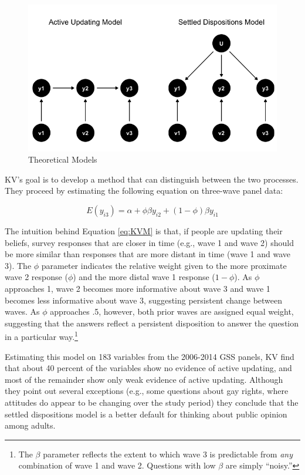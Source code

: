 \documentclass[
  11pt,
]{article}
\begin{document}
\begin{figure}

{\centering \includegraphics[width=0.8\linewidth]{KVimage} 

}

\caption{Theoretical Models}\label{fig:mods}
\end{figure}

KV's goal is to develop a method that can distinguish between the two processes. They proceed by estimating the following equation on three-wave panel data:

\begin{equation}
  E(y_{i3}) = \alpha + \phi\beta y_{i2} + (1-\phi)\beta y_{i1} \label{eq:KVM}
\end{equation}

The intuition behind Equation \eqref{eq:KVM} is that, if people are updating their beliefs, survey responses that are closer in time (e.g., wave 1 and wave 2) should be more similar than responses that are more distant in time (wave 1 and wave 3). The \(\phi\) parameter indicates the relative weight given to the more proximate wave 2 response (\(\phi\)) and the more distal wave 1 response (\(1-\phi\)). As \(\phi\) approaches 1, wave 2 becomes more informative about wave 3 and wave 1 becomes less informative about wave 3, suggesting persistent change between waves. As \(\phi\) approaches .5, however, both prior waves are assigned equal weight, suggesting that the answers reflect a persistent disposition to answer the question in a particular way.\footnote{The \(\beta\) parameter reflects the extent to which wave 3 is predictable from \emph{any} combination of wave 1 and wave 2. Questions with low \(\beta\) are simply ``noisy.''}

Estimating this model on 183 variables from the 2006-2014 GSS panels, KV find that about 40 percent of the variables show no evidence of active updating, and most of the remainder show only weak evidence of active updating. Although they point out several exceptions (e.g., some questions about gay rights, where attitudes do appear to be changing over the study period) they conclude that the settled dispositions model is a better default for thinking about public opinion among adults.
\end{document}
